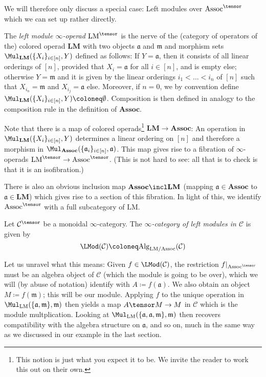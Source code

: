 \documentclass[topology]{bsteffan-notes}
\newcommand{\cC}{{\mathcal{C}}}
\newcommand{\fa}{{\mathfrak{a}}}
\newcommand{\fm}{{\mathfrak{m}}}
\newcommand{\Assoc}{\mathrm{Assoc}}
\newcommand{\LM}{\mathrm{LM}}
\newcommand{\Alg}{\mathrm{Alg}}
\begin{document}
We will therefore only discuss a special case: Left modules over $\Assoc^\tensor$ which we can set up rather directly.
\begin{definition}
	The \emph{left module $\infty$-operad} $\LM^\tensor$ is the nerve of the (category of operators of the) colored operad $\mathbf{LM}$ with two objects $\mathfrak{a}$ and $\mathfrak{m}$ and morphism sets $\Mul_{\mathbf{LM}}(\{X_i\}_{i \in [n]}, Y)$ defined as follows:
	If $Y = \mathfrak{a}$, then it consists of all linear orderings of $[n]$, provided that $X_i = \mathfrak{a}$ for all $i \in [n]$, and is empty else; otherwise $Y = \mathfrak{m}$ and it is given by the linear orderings $i_1 < \ldots < i_n$ of $[n]$ such that $X_{i_n} = \mathfrak{m}$ and $X_{i_j} = \mathfrak{a}$ else.
	Moreover, if $n = 0$, we by convention define $\Mul_{\mathbf{LM}}(\{X_i\}_{i \in [n]}, Y) \coloneq \emptyset$.
	Composition is then defined in analogy to the composition rule in the definition of $\mathbf{Assoc}$.
\end{definition}
Note that there is a map of colored operads\footnote{This notion is just what you expect it to be. We invite the reader to work this out on their own.} $\mathbf{LM} \to \mathbf{Assoc}$: An operation in $\Mul_{\mathbf{LM}}(\{X_i\}_{i \in [n]}, Y)$ determines a linear ordering on $[n]$ and therefore a morphism in $\Mul_{\mathbf{Assoc}}(\{\fa_i\}_{i \in [n]}, \fa)$.
This map gives rise to a fibration of $\infty$-operads $\LM^\tensor \to \Assoc^\tensor$. (This is not hard to see: all that is to check is that it is an isofibration.)

There is also an obvious inclusion map $\mathbf{Assoc} \incl \mathbf{LM}$ (mapping $\fa \in \mathbf{Assoc}$ to $\fa \in \mathbf{LM}$) which gives rise to a section of this fibration. 
In light of this, we identify $\Assoc^\tensor$ with a full subcategory of $\LM$.
\begin{definition}
	Let $\cC^\tensor$ be a monoidal $\infty$-category.
	The \emph{$\infty$-category of left modules in $\cC$} is given by 
	\begin{equation*}
		\LMod(\cC) \coloneq \Alg_{\LM / \Assoc}(\cC)
	\end{equation*}
\end{definition}
Let us unravel what this means:
Given $f \in \LMod(\cC)$, the restriction $f|_{\Assoc^\tensor}$ must be an algebra object of $\cC$ (which the module is going to be over), which we will (by abuse of notation) identify with $A \coloneq f(\fa)$.
We also obtain an object $M \coloneq f(\fm)$; this will be our module.
Applying $f$ to the unique operation in $\Mul_{\mathbf{\LM}}(\{\fa, \fm\}, \fm)$ then yields a map $A \tensor M \to M$ in $\cC$ which is the module multplication.
Looking at $\Mul_{\mathbf{\LM}}(\{\fa, \fa, \fm\}, \fm)$ then recovers compatibility with the algebra structure on $\fa$, and so on, much in the same way as we discussed in our example in the last section.

\printbibliography
\end{document}
